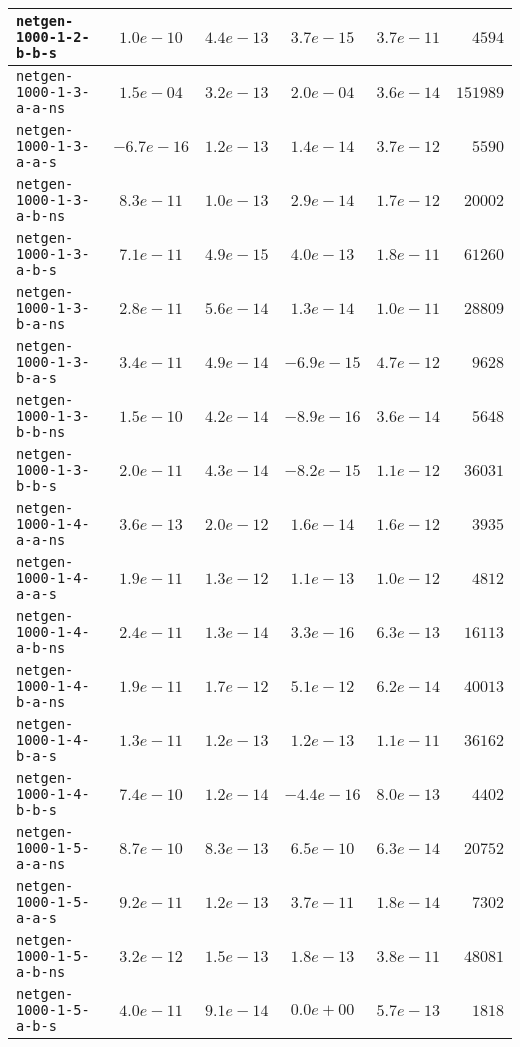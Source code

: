 \begin{center}
\begin{longtable}{|l || c | c | c | c | r|}
\hline
\texttt{netgen-1000-1-2-b-b-s} & $1.0e-10$ & $4.4e-13$ & $3.7e-15$ & $3.7e-11$ & $4594$ \\
\hline
\texttt{netgen-1000-1-3-a-a-ns} & $1.5e-04$ & $3.2e-13$ & $2.0e-04$ & $3.6e-14$ & $151989$ \\
\hline
\texttt{netgen-1000-1-3-a-a-s} & $-6.7e-16$ & $1.2e-13$ & $1.4e-14$ & $3.7e-12$ & $5590$ \\
\hline
\texttt{netgen-1000-1-3-a-b-ns} & $8.3e-11$ & $1.0e-13$ & $2.9e-14$ & $1.7e-12$ & $20002$ \\
\hline
\texttt{netgen-1000-1-3-a-b-s} & $7.1e-11$ & $4.9e-15$ & $4.0e-13$ & $1.8e-11$ & $61260$ \\
\hline
\texttt{netgen-1000-1-3-b-a-ns} & $2.8e-11$ & $5.6e-14$ & $1.3e-14$ & $1.0e-11$ & $28809$ \\
\hline
\texttt{netgen-1000-1-3-b-a-s} & $3.4e-11$ & $4.9e-14$ & $-6.9e-15$ & $4.7e-12$ & $9628$ \\
\hline
\texttt{netgen-1000-1-3-b-b-ns} & $1.5e-10$ & $4.2e-14$ & $-8.9e-16$ & $3.6e-14$ & $5648$ \\
\hline
\texttt{netgen-1000-1-3-b-b-s} & $2.0e-11$ & $4.3e-14$ & $-8.2e-15$ & $1.1e-12$ & $36031$ \\
\hline
\texttt{netgen-1000-1-4-a-a-ns} & $3.6e-13$ & $2.0e-12$ & $1.6e-14$ & $1.6e-12$ & $3935$ \\
\hline
\texttt{netgen-1000-1-4-a-a-s} & $1.9e-11$ & $1.3e-12$ & $1.1e-13$ & $1.0e-12$ & $4812$ \\
\hline
\texttt{netgen-1000-1-4-a-b-ns} & $2.4e-11$ & $1.3e-14$ & $3.3e-16$ & $6.3e-13$ & $16113$ \\
\hline
\texttt{netgen-1000-1-4-b-a-ns} & $1.9e-11$ & $1.7e-12$ & $5.1e-12$ & $6.2e-14$ & $40013$ \\
\hline
\texttt{netgen-1000-1-4-b-a-s} & $1.3e-11$ & $1.2e-13$ & $1.2e-13$ & $1.1e-11$ & $36162$ \\
\hline
\texttt{netgen-1000-1-4-b-b-s} & $7.4e-10$ & $1.2e-14$ & $-4.4e-16$ & $8.0e-13$ & $4402$ \\
\hline
\texttt{netgen-1000-1-5-a-a-ns} & $8.7e-10$ & $8.3e-13$ & $6.5e-10$ & $6.3e-14$ & $20752$ \\
\hline
\texttt{netgen-1000-1-5-a-a-s} & $9.2e-11$ & $1.2e-13$ & $3.7e-11$ & $1.8e-14$ & $7302$ \\
\hline
\texttt{netgen-1000-1-5-a-b-ns} & $3.2e-12$ & $1.5e-13$ & $1.8e-13$ & $3.8e-11$ & $48081$ \\
\hline
\texttt{netgen-1000-1-5-a-b-s} & $4.0e-11$ & $9.1e-14$ & $0.0e+00$ & $5.7e-13$ & $1818$ \\

\end{longtable}
\end{center}

